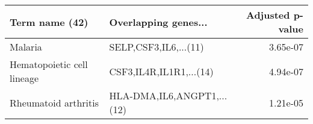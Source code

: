 \begin{tabular}{llr}
\toprule
            Term name (42) &       Overlapping genes... &  Adjusted p-value \\
\midrule
                   Malaria &      SELP,CSF3,IL6,...(11) &          3.65e-07 \\
Hematopoietic cell lineage &    CSF3,IL4R,IL1R1,...(14) &          4.94e-07 \\
      Rheumatoid arthritis & HLA-DMA,IL6,ANGPT1,...(12) &          1.21e-05 \\
\bottomrule
\end{tabular}
